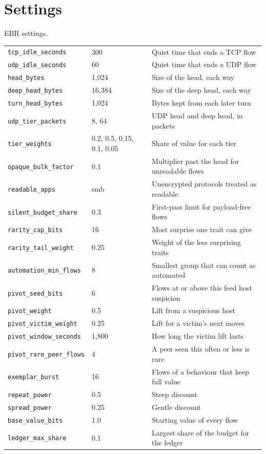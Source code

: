 \chapter{Settings}

\begin{gtable}{EBR settings.}
\begin{tabularx}{\linewidth}{l l L}
\toprule
{} &  & \\
\midrule
\texttt{tcp\_idle\_seconds} & 300 & Quiet time that ends a TCP flow\\
\texttt{udp\_idle\_seconds} & 60 & Quiet time that ends a UDP flow\\
\texttt{head\_bytes} & 1,024 & Size of the head, each way\\
\texttt{deep\_head\_bytes} & 16,384 & Size of the deep head, each way\\
\texttt{turn\_head\_bytes} & 1,024 & Bytes kept from each later turn\\
\texttt{udp\_tier\_packets} & 8, 64 & UDP head and deep head, in packets\\
\texttt{tier\_weights} & 0.2, 0.5, 0.15, 0.1, 0.05 & Share of value for each tier\\
\texttt{opaque\_bulk\_factor} & 0.1 & Multiplier past the head for unreadable flows\\
\texttt{readable\_apps} & smb & Unencrypted protocols treated as readable\\
\texttt{silent\_budget\_share} & 0.3 & First-pass limit for payload-free flows\\
\texttt{rarity\_cap\_bits} & 16 & Most surprise one trait can give\\
\texttt{rarity\_tail\_weight} & 0.25 & Weight of the less surprising traits\\
\texttt{automation\_min\_flows} & 8 & Smallest group that can count as automated\\
\texttt{pivot\_seed\_bits} & 6 & Flows at or above this feed host suspicion\\
\texttt{pivot\_weight} & 0.5 & Lift from a suspicious host\\
\texttt{pivot\_victim\_weight} & 0.25 & Lift for a victim's next moves\\
\texttt{pivot\_window\_seconds} & 1,800 & How long the victim lift lasts\\
\texttt{pivot\_rare\_peer\_flows} & 4 & A peer seen this often or less is rare\\
\texttt{exemplar\_burst} & 16 & Flows of a behaviour that keep full value\\
\texttt{repeat\_power} & 0.5 & Steep discount\\
\texttt{spread\_power} & 0.25 & Gentle discount\\
\texttt{base\_value\_bits} & 1.0 & Starting value of every flow\\
\texttt{ledger\_max\_share} & 0.1 & Largest share of the budget for the ledger\\
\bottomrule
\end{tabularx}
\end{gtable}

